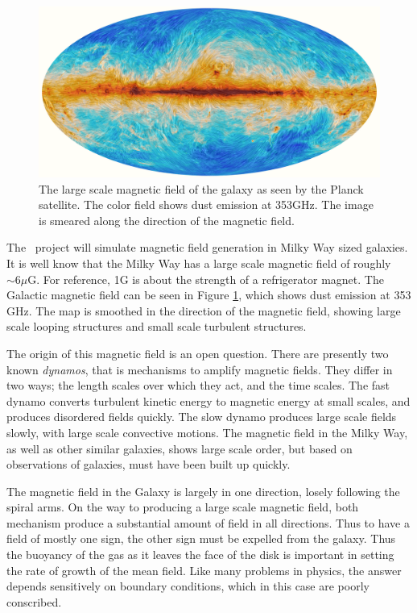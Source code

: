 \begin{figure} \begin{center}
\includegraphics[width=\textwidth]{figs/2015_353GHz_B-field.png}
\caption[ ]{The large scale magnetic field of the galaxy as seen by the Planck
satellite. The color field shows dust emission at 353GHz.  The image is smeared
along the direction of the magnetic field.  \citep{PlanckXIX15}}
\label{fig.PlanckField} \end{center} \end{figure}

The \nameGalaxies\ project will simulate magnetic field generation in Milky Way
sized galaxies.  It is well know that the Milky Way has a large scale magnetic
field of roughly $\sim 6 \mu$G.  For reference, 1G is about the strength of a refrigerator
magnet.  The Galactic magnetic field can be seen in Figure \ref{fig.PlanckField}, which shows dust
emission at 353 GHz. The map is smoothed in the direction of the magnetic field,
showing large scale looping structures and small scale turbulent structures.

The origin of this magnetic field is an open question.  There are presently two
known \emph{dynamos}, that is mechanisms to amplify magnetic fields. They differ in
two ways; the length scales over which they act, and the time scales.  The fast
dynamo converts turbulent kinetic energy to magnetic energy at small scales, and
produces disordered fields quickly.  The slow dynamo produces large scale fields
slowly, with large scale convective motions. The magnetic field in the Milky Way, as well as other similar galaxies,
shows large scale order, but based on observations of galaxies, must have been
built up quickly. 

The magnetic field in the Galaxy is largely in one direction, losely following
the spiral arms.  On the way to producing a large scale magnetic field, both mechanism produce a
substantial amount of field in all directions.  Thus to have a field of mostly
one sign, the other sign must be expelled from the galaxy.  
Thus the buoyancy of the gas as
it leaves the face of the disk is important in setting the rate of growth of
the mean field.  Like many problems in physics, the answer depends sensitively
on boundary conditions, which in this case are poorly conscribed.

